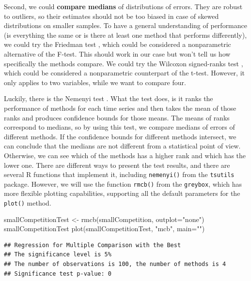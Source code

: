 \documentclass[
]{book}
\newenvironment{Shaded}{\begin{snugshade}}{\end{snugshade}}
\newcommand{\AttributeTok}[1]{\textcolor[rgb]{0.77,0.63,0.00}{#1}}
\newcommand{\FunctionTok}[1]{\textcolor[rgb]{0.00,0.00,0.00}{#1}}
\newcommand{\NormalTok}[1]{#1}
\newcommand{\OtherTok}[1]{\textcolor[rgb]{0.56,0.35,0.01}{#1}}
\newcommand{\StringTok}[1]{\textcolor[rgb]{0.31,0.60,0.02}{#1}}
\theoremstyle{definition}
\theoremstyle{definition}
\theoremstyle{definition}
\theoremstyle{definition}
\theoremstyle{remark}
\begin{document}
Second, we could \textbf{compare medians} of distributions of errors. They are robust to outliers, so their estimates should not be too biased in case of skewed distributions on smaller samples. To have a general understanding of performance (is everything the same or is there at least one method that performs differently), we could try the Friedman test \citep{WikipediaFriedmanTest}, which could be considered a nonparametric alternative of the F-test. This should work in our case but won't tell us how specifically the methods compare. We could try the Wilcoxon signed-ranks test \citep{WikipediaWilcoxonTest}, which could be considered a nonparametric counterpart of the t-test. However, it only applies to two variables, while we want to compare four.

Luckily, there is the Nemenyi test \citep{Demsar2006} \citep[ shows that it is equivalent to the MCB test of \citet{Koning2005}]{KourentzesWeb2012}. What the test does, is it ranks the performance of methods for each time series and then takes the mean of those ranks and produces confidence bounds for those means. The means of ranks correspond to medians, so by using this test, we compare medians of errors of different methods. If the confidence bounds for different methods intersect, we can conclude that the medians are not different from a statistical point of view. Otherwise, we can see which of the methods has a higher rank and which has the lower one. There are different ways to present the test results, and there are several R functions that implement it, including \texttt{nemenyi()} from the \texttt{tsutils} package. However, we will use the function \texttt{rmcb()} from the \texttt{greybox}, which has more flexible plotting capabilities, supporting all the default parameters for the \texttt{plot()} method.

\begin{Shaded}
\begin{Highlighting}[]
\NormalTok{smallCompetitionTest }\OtherTok{\textless{}{-}} \FunctionTok{rmcb}\NormalTok{(smallCompetition, }\AttributeTok{outplot=}\StringTok{"none"}\NormalTok{)}
\NormalTok{smallCompetitionTest}
\FunctionTok{plot}\NormalTok{(smallCompetitionTest, }\StringTok{"mcb"}\NormalTok{, }\AttributeTok{main=}\StringTok{""}\NormalTok{)}
\end{Highlighting}
\end{Shaded}

\begin{verbatim}
## Regression for Multiple Comparison with the Best
## The significance level is 5%
## The number of observations is 100, the number of methods is 4
## Significance test p-value: 0
\end{verbatim}
\end{document}
